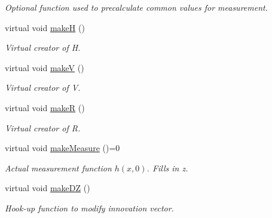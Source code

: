 \begin{Indent}
\begin{DoxyCompactItemize}
\begin{DoxyCompactList}\small\item\em Optional function used to precalculate common values for measurement. \end{DoxyCompactList}\item 
\mbox{\label{classKalman_1_1EKFilter_a357df3cc6833241d5430c58feaed14ed}} 
virtual void \mbox{\hyperlink{classKalman_1_1EKFilter_a357df3cc6833241d5430c58feaed14ed}{makeH}} ()
\begin{DoxyCompactList}\small\item\em Virtual creator of {\itshape H}. \end{DoxyCompactList}\item 
virtual void \mbox{\hyperlink{classKalman_1_1EKFilter_a70bb019d226cbf9858954b81c89392a7}{makeV}} ()
\begin{DoxyCompactList}\small\item\em Virtual creator of {\itshape V}. \end{DoxyCompactList}\item 
virtual void \mbox{\hyperlink{classKalman_1_1EKFilter_aff7a7f2d08673db1330e04e349b3bb8b}{makeR}} ()
\begin{DoxyCompactList}\small\item\em Virtual creator of {\itshape R}. \end{DoxyCompactList}\item 
virtual void \mbox{\hyperlink{classKalman_1_1EKFilter_aac9f6d80e5ec9e6ea2ccf045cb682df8}{make\+Measure}} ()=0
\begin{DoxyCompactList}\small\item\em Actual measurement function $ h(x, 0) $. Fills in {\itshape z}. \end{DoxyCompactList}\item 
virtual void \mbox{\hyperlink{classKalman_1_1EKFilter_a54a168299879f6b3023b0a42b1afe29d}{make\+DZ}} ()
\begin{DoxyCompactList}\small\item\em Hook-\/up function to modify innovation vector. \end{DoxyCompactList}\end{DoxyCompactItemize}
\end{Indent}
